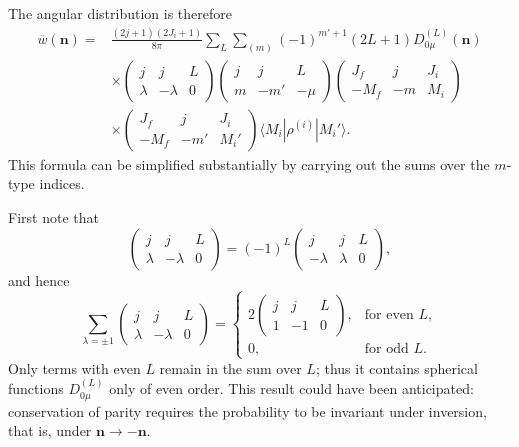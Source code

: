 The angular distribution is therefore
\[
\begin{split}
\overline w(\mathbf n)={}&\frac{(2j+1)(2J_i+1)}{8\pi}
\sum_L\sum_{(m)}(-1)^{m'+1}(2L+1)D_{0\mu}^{(L)}(\mathbf n)\\
&\times\begin{pmatrix}j&j&L\\\lambda&-\lambda&0\end{pmatrix}
\begin{pmatrix}j&j&L\\m&-m'&-\mu\end{pmatrix}
\begin{pmatrix}J_f&j&J_i\\-M_f&-m&M_i\end{pmatrix}\\
&\times\begin{pmatrix}J_f&j&J_i\\-M_f&-m'&M_i'\end{pmatrix}
\langle M_i|\rho^{(i)}|M_i'\rangle .
\end{split}
\]
This formula can be simplified substantially by carrying out the sums over the $m$-type indices.

First note that
\begin{equation}
\begin{pmatrix}j&j&L\\\lambda&-\lambda&0\end{pmatrix}
=(-1)^L\begin{pmatrix}j&j&L\\-\lambda&\lambda&0\end{pmatrix},
\tag{48.8}
\end{equation}
and hence
\[
\sum_{\lambda=\pm1}\begin{pmatrix}j&j&L\\\lambda&-\lambda&0\end{pmatrix}
=\begin{cases}
2\begin{pmatrix}j&j&L\\1&-1&0\end{pmatrix},&\text{for even }L,\\
0,&\text{for odd }L.
\end{cases}
\]
Only terms with even $L$ remain in the sum over $L$; thus it contains spherical functions $D_{0\mu}^{(L)}$ only of even order. This result could have been anticipated: conservation of parity requires the probability to be invariant under inversion, that is, under $\mathbf n\to-\mathbf n$.

